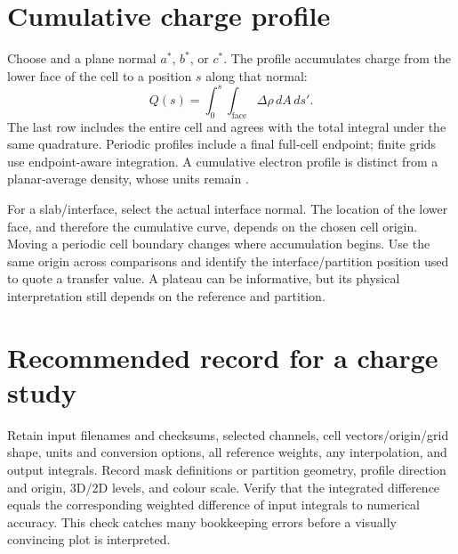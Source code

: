 \section{Cumulative charge profile}
Choose  and a plane normal $a^*$, $b^*$, or $c^*$. The profile accumulates charge from the lower face of the cell to a position $s$ along that normal:
\[
Q(s)=\int_{0}^{s}\!\int_{\text{face}}\Delta\rho\,dA\,ds'.
\]
The last row includes the entire cell and agrees with the total integral under the same quadrature. Periodic profiles include a final full-cell endpoint; finite grids use endpoint-aware integration. A cumulative electron profile is distinct from a planar-average density, whose units remain \densityunit.

For a slab/interface, select the actual interface normal. The location of the lower face, and therefore the cumulative curve, depends on the chosen cell origin. Moving a periodic cell boundary changes where accumulation begins. Use the same origin across comparisons and identify the interface/partition position used to quote a transfer value. A plateau can be informative, but its physical interpretation still depends on the reference and partition.

\section{Recommended record for a charge study}
Retain input filenames and checksums, selected channels, cell vectors/origin/grid shape, units and conversion options, all reference weights, any interpolation, and output integrals. Record mask definitions or partition geometry, profile direction and origin, 3D/2D levels, and colour scale. Verify that the integrated difference equals the corresponding weighted difference of input integrals to numerical accuracy. This check catches many bookkeeping errors before a visually convincing plot is interpreted.
